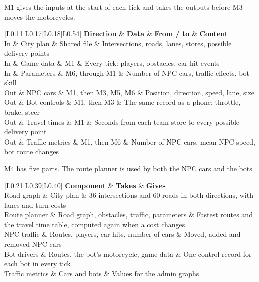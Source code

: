 \documentclass[
  english,
  10pt,
  a4paper,
]{article}
\newcommand{\ckkeep}[1]{\par\noindent\begin{minipage}{\linewidth}\setlength{\parskip}{4pt}#1\end{minipage}\par\smallskip}
\begin{document}

\ckkeep{%
M1 gives the inputs at the start of each tick and takes the outputs before M3 moves the motorcycles.

\begin{tabular}{|L{0.11}|L{0.17}|L{0.18}|L{0.54}|}
\hline \textbf{Direction} & \textbf{Data} & \textbf{From / to} & \textbf{Content} \\ \hline 
In & City plan & Shared file & Intersections, roads, lanes, stores, possible delivery points \\ \hline
In & Game data & M1 & Every tick: players, obstacles, car hit events \\ \hline
In & Parameters & M6, through M1 & Number of NPC cars, traffic effects, bot skill \\ \hline
Out & NPC cars & M1, then M3, M5, M6 & Position, direction, speed, lane, size \\ \hline
Out & Bot controls & M1, then M3 & The same record as a phone: throttle, brake, steer \\ \hline
Out & Travel times & M1 & Seconds from each team store to every possible delivery point \\ \hline
Out & Traffic metrics & M1, then M6 & Number of NPC cars, mean NPC speed, bot route changes \\ \hline
\end{tabular}}


\ckkeep{%
M4 has five parts. The route planner is used by both the NPC cars and the bots.

\begin{tabular}{|L{0.21}|L{0.39}|L{0.40}|}
\hline \textbf{Component} & \textbf{Takes} & \textbf{Gives} \\ \hline 
Road graph & City plan & 36 intersections and 60 roads in both directions, with lanes and turn costs \\ \hline
Route planner & Road graph, obstacles, traffic, parameters & Fastest routes and the travel time table, computed again when a cost changes \\ \hline
NPC traffic & Routes, players, car hits, number of cars & Moved, added and removed NPC cars \\ \hline
Bot drivers & Routes, the bot's motorcycle, game data & One control record for each bot in every tick \\ \hline
Traffic metrics & Cars and bots & Values for the admin graphs \\ \hline
\end{tabular}}
\end{document}
